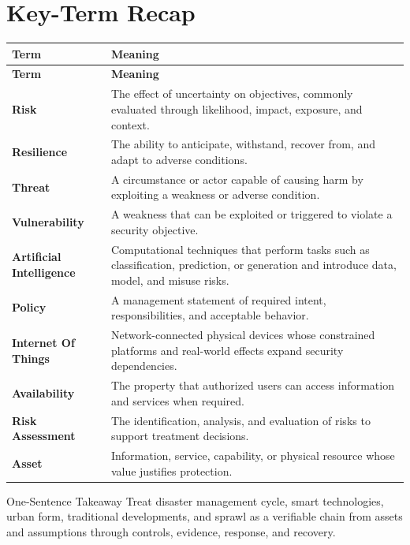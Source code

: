 \documentclass[11pt,letterpaper]{article}
\begin{document}
\section*{Key-Term Recap}
\begin{longtable}{>{\raggedright\arraybackslash}p{}>{\raggedright\arraybackslash}p{}}
\toprule\rowcolor{Navy}\color{white}\textbf{Term} & \color{white}\textbf{Meaning}\\\midrule
\endfirsthead
\toprule\rowcolor{Navy}\color{white}\textbf{Term} & \color{white}\textbf{Meaning}\\\midrule
\endhead
\textbf{Risk} & The effect of uncertainty on objectives, commonly evaluated through likelihood, impact, exposure, and context. \\\midrule
\textbf{Resilience} & The ability to anticipate, withstand, recover from, and adapt to adverse conditions. \\\midrule
\textbf{Threat} & A circumstance or actor capable of causing harm by exploiting a weakness or adverse condition. \\\midrule
\textbf{Vulnerability} & A weakness that can be exploited or triggered to violate a security objective. \\\midrule
\textbf{Artificial Intelligence} & Computational techniques that perform tasks such as classification, prediction, or generation and introduce data, model, and misuse risks. \\\midrule
\textbf{Policy} & A management statement of required intent, responsibilities, and acceptable behavior. \\\midrule
\textbf{Internet Of Things} & Network-connected physical devices whose constrained platforms and real-world effects expand security dependencies. \\\midrule
\textbf{Availability} & The property that authorized users can access information and services when required. \\\midrule
\textbf{Risk Assessment} & The identification, analysis, and evaluation of risks to support treatment decisions. \\\midrule
\textbf{Asset} & Information, service, capability, or physical resource whose value justifies protection. \\\midrule
\bottomrule
\end{longtable}
\begin{CornellExamBox}{One-Sentence Takeaway}
Treat disaster management cycle, smart technologies, urban form, traditional developments, and sprawl as a verifiable chain from assets and assumptions through controls, evidence, response, and recovery.
\end{CornellExamBox}
\end{document}
